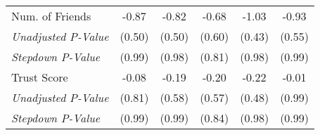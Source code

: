 \begin{tabular}{l c c c c c}
Num. of Friends & -0.87 & -0.82 & -0.68 & -1.03 & -0.93 \\
\quad \textit{Unadjusted P-Value} & (0.50) & (0.50) & (0.60) & (0.43) & (0.55) \\
\quad \textit{Stepdown P-Value} & (0.99) & (0.98) & (0.81) & (0.98) & (0.99) \\
Trust Score & -0.08 & -0.19 & -0.20 & -0.22 & -0.01 \\
\quad \textit{Unadjusted P-Value} & (0.81) & (0.58) & (0.57) & (0.48) & (0.99) \\
\quad \textit{Stepdown P-Value} & (0.99) & (0.99) & (0.84) & (0.98) & (0.99) \\
\bottomrule
\end{tabular}
